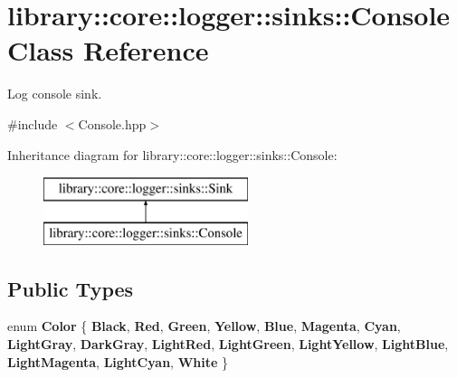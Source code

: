 \hypertarget{classlibrary_1_1core_1_1logger_1_1sinks_1_1_console}{}\section{library\+:\+:core\+:\+:logger\+:\+:sinks\+:\+:Console Class Reference}
\label{classlibrary_1_1core_1_1logger_1_1sinks_1_1_console}


Log console sink.  




{\ttfamily \#include $<$Console.\+hpp$>$}

Inheritance diagram for library\+:\+:core\+:\+:logger\+:\+:sinks\+:\+:Console\+:\begin{figure}[H]
\begin{center}
\leavevmode
\includegraphics[height=2.000000cm]{classlibrary_1_1core_1_1logger_1_1sinks_1_1_console}
\end{center}
\end{figure}
\subsection*{Public Types}
\begin{DoxyCompactItemize}
\item 
\mbox{\label{classlibrary_1_1core_1_1logger_1_1sinks_1_1_console_aa7a07d8165e1df74ad4d289d5220bc96}} 
enum {\bfseries Color} \{ \newline
{\bfseries Black}, 
{\bfseries Red}, 
{\bfseries Green}, 
{\bfseries Yellow}, 
\newline
{\bfseries Blue}, 
{\bfseries Magenta}, 
{\bfseries Cyan}, 
{\bfseries Light\+Gray}, 
\newline
{\bfseries Dark\+Gray}, 
{\bfseries Light\+Red}, 
{\bfseries Light\+Green}, 
{\bfseries Light\+Yellow}, 
\newline
{\bfseries Light\+Blue}, 
{\bfseries Light\+Magenta}, 
{\bfseries Light\+Cyan}, 
{\bfseries White}
 \}
\end{DoxyCompactItemize}
